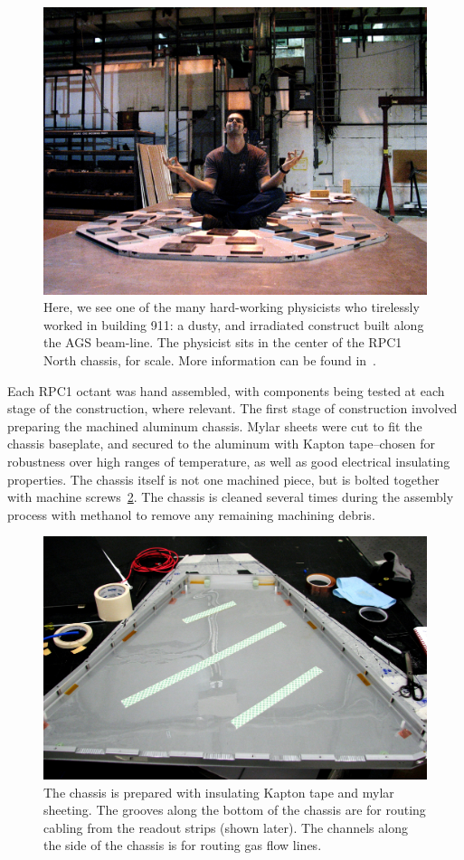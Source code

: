 \begin{figure}
  \centering
  \includegraphics[width=0.7\linewidth]{./figures/mike_in_rpc1}
  \caption{
    Here, we see one of the many hard-working physicists who tirelessly worked
    in building 911: a dusty, and irradiated construct built along the AGS
    beam-line. The physicist sits in the center of the RPC1 North chassis, for
    scale. More information can be found in~\cite{Beaumier2016}.
  }
  \label{fig:mike_in_rpc1}
\end{figure}

Each RPC1 octant was hand assembled, with components being tested at each stage
of the construction, where relevant. The first stage of construction involved
preparing the machined aluminum chassis. Mylar sheets were cut to fit the
chassis baseplate, and secured to the aluminum with Kapton tape--chosen for
robustness over high ranges of temperature, as well as good electrical
insulating properties. The chassis itself is not one machined piece, but is
bolted together with machine screws~\ref{fig:rpc1_construction_1}. The chassis
is cleaned several times during the assembly process with methanol to remove any
remaining machining debris.

\begin{figure}
  \centering
  \includegraphics[width=0.7\linewidth]{./figures/rpc1_construction_1}
  \caption{
    The chassis is prepared with insulating Kapton tape and mylar sheeting. The
    grooves along the bottom of the chassis are for routing cabling from the
    readout strips (shown later). The channels along the side of the chassis is
    for routing gas flow lines.
  }
  \label{fig:rpc1_construction_1}
\end{figure}

